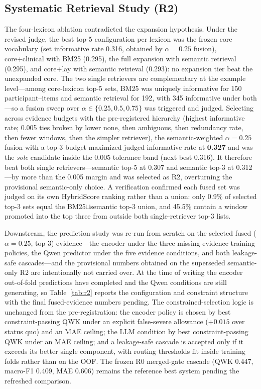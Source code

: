 \documentclass{article}
\newcommand{\best}[1]{\textbf{#1}}
\begin{document}
{\color{red}%
\subsection{Systematic Retrieval Study (R2)}
\label{subsec:r2-results}
The four-lexicon ablation contradicted the expansion hypothesis. Under the revised judge, the best top-5 configuration per lexicon was the frozen core vocabulary (set informative rate 0.316, obtained by $\alpha=0.25$ fusion), core+clinical with BM25 (0.295), the full expansion with semantic retrieval (0.295), and core+lay with semantic retrieval (0.293): no expansion tier beat the unexpanded core. The two single retrievers are complementary at the example level---among core-lexicon top-5 sets, BM25 was uniquely informative for 150 participant--items and semantic retrieval for 192, with 345 informative under both---so a fusion sweep over $\alpha\in\{0.25,0.5,0.75\}$ was triggered and judged. Selecting across evidence budgets with the pre-registered hierarchy (highest informative rate; 0.005 ties broken by lower none, then ambiguous, then redundancy rate, then fewer windows, then the simpler retriever), the semantic-weighted $\alpha=0.25$ fusion with a top-3 budget maximized judged informative rate at \best{0.327} and was the \emph{sole} candidate inside the 0.005 tolerance band (next best 0.316). It therefore beat both single retrievers---semantic top-5 at 0.307 and semantic top-3 at 0.312---by more than the 0.005 margin and was selected as R2, overturning the provisional semantic-only choice. A verification confirmed each fused set was judged on its own HybridScore ranking rather than a union: only 0.9\% of selected top-3 sets equal the BM25$\cup$semantic top-3 union, and 45.5\% contain a window promoted into the top three from outside both single-retriever top-3 lists.

Downstream, the prediction study was re-run from scratch on the selected fused ($\alpha=0.25$, top-3) evidence---the encoder under the three missing-evidence training policies, the Qwen predictor under the five evidence conditions, and both leakage-safe cascades---and the provisional numbers obtained on the superseded semantic-only R2 are intentionally not carried over. At the time of writing the encoder out-of-fold predictions have completed and the Qwen conditions are still generating, so Table~\ref{tab:r2} reports the configuration and constraint structure with the final fused-evidence numbers pending. The constrained-selection logic is unchanged from the pre-registration: the encoder policy is chosen by best constraint-passing QWK under an explicit false-severe allowance ($+0.015$ over status quo) and an MAE ceiling; the LLM condition by best constraint-passing QWK under an MAE ceiling; and a leakage-safe cascade is accepted only if it exceeds its better single component, with routing thresholds fit inside training folds rather than on the OOF. The frozen R0 merged-gate cascade (QWK 0.447, macro-F1 0.409, MAE 0.606) remains the reference best system pending the refreshed comparison.

}
\end{document}
